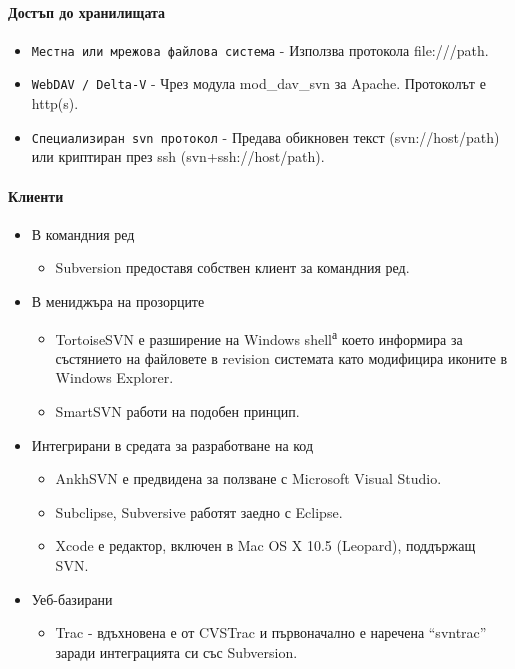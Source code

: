 \documentclass[a4paper]{article}
\begin{document}
    \paragraph{Достъп до хранилищата}

    \begin{itemize}
      \item \texttt{Местна или мрежова файлова система} - Използва протокола file:///path.
      \item \texttt{WebDAV / Delta-V} - Чрез модула mod\_dav\_svn за Apache. Протоколът е http(s).
      \item \texttt{Специализиран svn протокол} - Предава обикновен текст (svn://host/path) или криптиран през ssh (svn+ssh://host/path).
    \end{itemize}

    \paragraph{Клиенти}

    \begin{itemize}
      \item В командния ред
        \begin{itemize}
          \item Subversion предоставя собствен клиент за командния ред.
        \end{itemize}
      \item В мениджъра на прозорците
        \begin{itemize}
          \item TortoiseSVN е разширение на Windows shell\textsuperscript{а} което информира за състянието на файловете в revision системата като модифицира иконите в Windows Explorer.
          \item SmartSVN работи на подобен принцип.
        \end{itemize}
      \item Интегрирани в средата за разработване на код
        \begin{itemize}
          \item AnkhSVN е предвидена за ползване с Microsoft Visual Studio.
          \item Subclipse, Subversive работят заедно с Eclipse.
          \item Xcode е редактор, включен в Mac OS X 10.5 (Leopard), поддържащ SVN.
        \end{itemize}
      \item Уеб-базирани
        \begin{itemize}
          \item Trac - вдъхновена е от CVSTrac и първоначално е наречена ``svntrac'' заради интеграцията си със Subversion.
        \end{itemize}
    \end{itemize}
\end{document}
